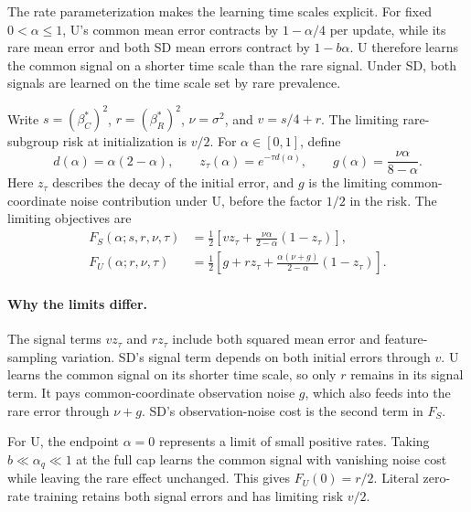 \documentclass{alt2027}
\begin{document}
The rate parameterization makes the learning time scales explicit. For fixed
$0 < \alpha \leq 1$, U's common mean error contracts by $1 - \alpha/4$ per
update, while its rare mean error and both SD mean errors contract by
$1 - b\alpha$. U therefore learns the common signal on a shorter time scale than
the rare signal. Under SD, both signals are learned on the time scale set by
rare prevalence.

Write $s = (\beta_C^*)^2$, $r = (\beta_R^*)^2$, $\nu = \sigma^2$, and
$v = s/4 + r$. The limiting rare-subgroup risk at initialization is $v/2$. For
$\alpha \in[0,1]$, define
\[
  d(\alpha) = \alpha(2 - \alpha),\qquad z_\tau(\alpha)
            = e^{-\tau d(\alpha)},\qquad g(\alpha)
            = \frac{\nu\alpha}{8 - \alpha}.
\]
Here $z_\tau$ describes the decay of the initial error, and $g$ is the limiting
common-coordinate noise contribution under U, before the factor $1/2$ in the
risk. The limiting objectives are
\begin{equation}
  \begin{aligned}
    F_S(\alpha;s,r,\nu,\tau) & = \frac12\left[ vz_\tau + \frac{\nu\alpha}{2 - \alpha}(1 - z_\tau) \right],           \\
    F_U(\alpha;r,\nu,\tau)   & = \frac12\left[ g + rz_\tau + \frac{\alpha(\nu + g)}{2 - \alpha}(1 - z_\tau) \right].
  \end{aligned} \label{eq:limiting-objectives}
\end{equation}

\paragraph{Why the limits differ.}

The signal terms $vz_\tau$ and $rz_\tau$ include both squared mean error and
feature-sampling variation. SD's signal term depends on both initial errors
through $v$. U learns the common signal on its shorter time scale, so only $r$
remains in its signal term. It pays common-coordinate observation noise $g$,
which also feeds into the rare error through $\nu + g$. SD's observation-noise
cost is the second term in $F_S$.

For U, the endpoint $\alpha = 0$ represents a limit of small positive rates.
Taking $b \ll \alpha_q \ll 1$ at the full cap learns the common signal with
vanishing noise cost while leaving the rare effect unchanged. This gives
$F_U(0) = r/2$. Literal zero-rate training retains both signal errors and has
limiting risk $v/2$.
\end{document}

